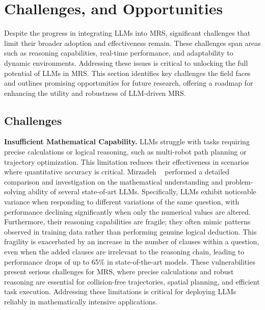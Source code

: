 \section{Challenges, and Opportunities}\label{sec:7-discussion}
Despite the progress in integrating LLMs into MRS, significant challenges that limit their broader adoption and effectiveness remain. These challenges span areas such as reasoning capabilities, real-time performance, and adaptability to dynamic environments. Addressing these issues is critical to unlocking the full potential of LLMs in MRS. This section identifies key challenges the field faces and outlines promising opportunities for future research, offering a roadmap for enhancing the utility and robustness of LLM-driven MRS.

\subsection{Challenges}

\textbf{Insufficient Mathematical Capability.}
LLMs struggle with tasks requiring precise calculations or logical reasoning, such as multi-robot path planning or trajectory optimization. This limitation reduces their effectiveness in scenarios where quantitative accuracy is critical. Mirzadeh \etal~\cite{mirzadeh_gsm-symbolic_2024} performed a detailed comparison and investigation on the mathematical understanding and problem-solving ability of several state-of-art LLMs. Specifically, LLMs exhibit noticeable variance when responding to different variations of the same question, with performance declining significantly when only the numerical values are altered. Furthermore, their reasoning capabilities are fragile; they often mimic patterns observed in training data rather than performing genuine logical deduction. This fragility is exacerbated by an increase in the number of clauses within a question, even when the added clauses are irrelevant to the reasoning chain, leading to performance drops of up to 65\% in state-of-the-art models. These vulnerabilities present serious challenges for MRS, where precise calculations and robust reasoning are essential for collision-free trajectories, spatial planning, and efficient task execution. Addressing these limitations is critical for deploying LLMs reliably in mathematically intensive applications.\\


